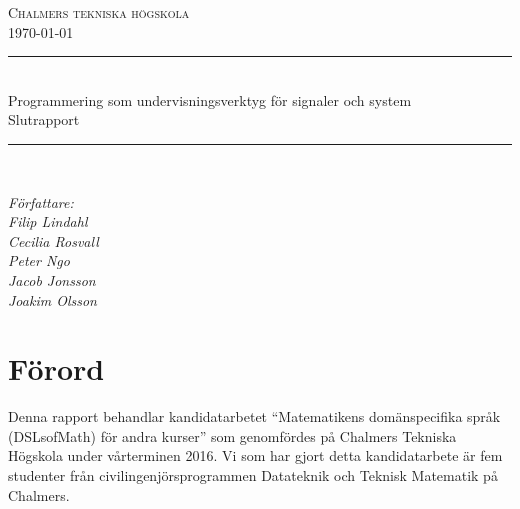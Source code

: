 \documentclass[]{article}
\date{\today}
\begin{document}
\begin{titlepage} \newcommand{\HRule}{\rule{\linewidth}{0.3mm}}
  \center
  \textsc{\Large Chalmers tekniska högskola}\\[0.05cm]
  \normalsize \today

  \HRule \\[0.08cm]
  { \large Programmering som undervisningsverktyg för signaler och system
    \\
    \normalsize{Slutrapport}
  } \\[0.08cm] %
  \HRule \\[0.3cm]

  \vfill

  \begin{flushleft}
    \small
    \emph{Författare: \\
      \quad Filip Lindahl\\
      \quad Cecilia Rosvall\\
      \quad Peter Ngo\\
      \quad Jacob Jonsson\\
      \quad Joakim Olsson\\}
  \end{flushleft}
\end{titlepage}
\newpage

\section*{Förord}
Denna rapport behandlar kandidatarbetet ``Matematikens domänspecifika språk (DSLsofMath) för andra kurser'' som
genomfördes på Chalmers Tekniska Högskola under vårterminen 2016. Vi som har gjort detta kandidatarbete är fem studenter
från civilingenjörsprogrammen Datateknik och Teknisk Matematik på Chalmers.
\end{document}

